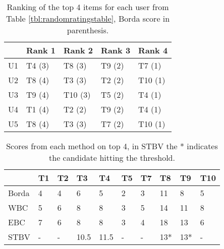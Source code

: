 \begin{table}[H]
	\centering
	\begin{tabular}{l|l|l|l|l|}
		\cline{2-5}
		& Rank 1 & Rank 2 & Rank 3 & Rank 4 \\ \hline
		\multicolumn{1}{|l|}{U1} & T4 (3) & T8 (3) & T9 (2) & T7 (1) \\ \hline
		\multicolumn{1}{|l|}{U2} & T8 (4) & T3 (3) & T2 (2) & T10 (1) \\ \hline
		\multicolumn{1}{|l|}{U3} & T9 (4) & T10 (3) & T5 (2) & T4 (1) \\ \hline
		\multicolumn{1}{|l|}{U4} & T1 (4) & T2 (2) & T9 (2) & T4 (1) \\ \hline
		\multicolumn{1}{|l|}{U5} & T8 (4) & T3 (3) & T7 (2) & T10 (1) \\ \hline
	\end{tabular}
	\caption{Ranking of the top 4 items for each user from Table \ref{tbl:randomratingstable}, Borda score in parenthesis.}
	\label{tbl:top4borda}
\end{table}

\begin{table}[H]
	\centering
	\begin{tabular}{l|l|l|l|l|l|l|l|l|l|}
		\cline{2-10}
		& T1 & T2 & T3   & T4   & T5 & T7 & T8  & T9  & T10 \\ \hline
		\multicolumn{1}{|l|}{Borda} & 4  & 4  & 6    & 5    & 2  & 3  & 11  & 8   & 5   \\ \hline
		\multicolumn{1}{|l|}{WBC}   & 5  & 6  & 8    & 8    & 3  & 5  & 14  & 11  & 8   \\ \hline
		\multicolumn{1}{|l|}{EBC}   & 7  & 6  & 8    & 8    & 3  & 4  & 18  & 13  & 6   \\ \hline
		\multicolumn{1}{|l|}{STBV}  & -  & -  & 10.5 & 11.5 & -  & -  & 13* & 13* & -   \\ \hline
	\end{tabular}
	\caption{Scores from each method on top 4, in STBV the * indicates the candidate hitting the threshold.}
	\label{tbl:novelscoresexample}
\end{table}